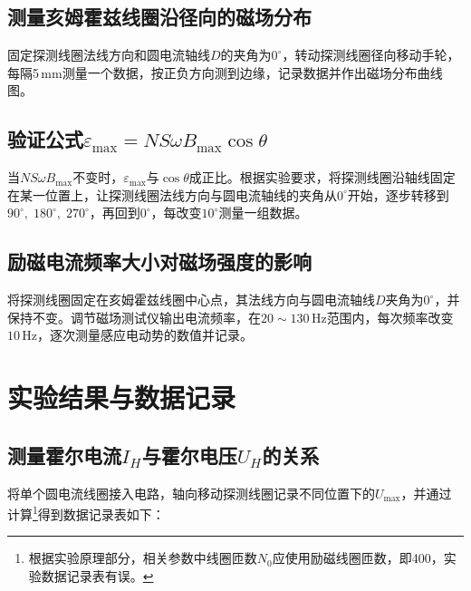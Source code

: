\documentclass[UTF-8,twoside,cs4size]{ctexart}
\begin{document}
	\subsection{测量亥姆霍兹线圈沿径向的磁场分布}
	固定探测线圈法线方向和圆电流轴线$ D $的夹角为$ 0^\circ $，转动探测线圈径向移动手轮，每隔5\,mm测量一个数据，按正负方向测到边缘，记录数据并作出磁场分布曲线图。
	\subsection{验证公式$ \varepsilon_\max=NS\omega B_\max\cos\theta $}
	当$ NS\omega B_\max $不变时，$ \varepsilon_\max $与$ \cos\theta $成正比。根据实验要求，将探测线圈沿轴线固定在某一位置上，让探测线圈法线方向与圆电流轴线的夹角从$ 0^\circ $开始，逐步转移到$ 90^\circ,\;180^\circ,\;270^\circ $，再回到$ 0^\circ $，每改变$ 10^\circ $测量一组数据。
	\subsection{励磁电流频率大小对磁场强度的影响}
	将探测线圈固定在亥姆霍兹线圈中心点，其法线方向与圆电流轴线$ D $夹角为$ 0^\circ $，并保持不变。调节磁场测试仪输出电流频率，在$ 20\sim 130\,\mathrm{Hz} $范围内，每次频率改变$ 10\,\mathrm{Hz} $，逐次测量感应电动势的数值并记录。
	
	\section{实验结果与数据记录}
	\subsection{测量霍尔电流$ I_H $与霍尔电压$ U_H $的关系}
	将单个圆电流线圈接入电路，轴向移动探测线圈记录不同位置下的$ U_\max $，并通过计算\footnote{根据实验原理部分，相关参数中线圈匝数$ N_0 $应使用励磁线圈匝数，即400，实验数据记录表有误。}得到数据记录表如下：
	
\end{document}
